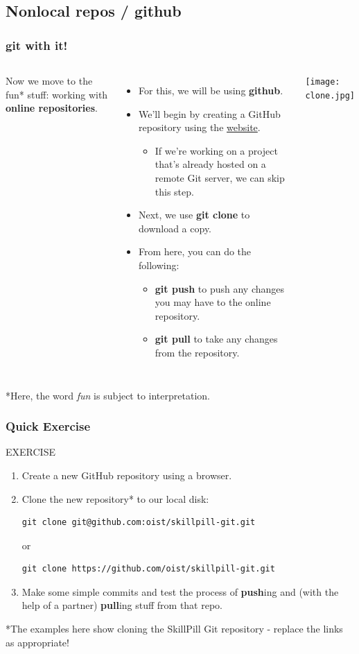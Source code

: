 \documentclass{beamer}
\begin{document}
\subsection{Nonlocal repos / github}

\begin{frame}
\frametitle{\textbf{git} with it!}
\begin{columns}
Now we move to the fun* stuff: working with \textbf{online repositories}.
\begin{itemize}
\item For this, we will be using \textbf{github}.
\item We'll begin by creating a GitHub repository using the \href{www.github.com}{website}.
\begin{itemize}
\item If we're working on a project that's already hosted on a remote Git server, we can skip this step.
\end{itemize}
\item Next, we use \textbf{git clone} to download a copy.
\item From here, you can do the following:
\begin{itemize}
\item \textbf{git push} to push any changes you may have to the online repository.
\item \textbf{git pull} to take any changes from the repository.
\end{itemize}
\end{itemize}
\texttt{[image: clone.jpg]}
\end{columns}

*Here, the word \textit{fun} is subject to interpretation.
\end{frame}

\begin{frame}[fragile]
\frametitle{Quick Exercise}
    \begin{block}{EXERCISE}
        \begin{enumerate}
        \item Create a new GitHub repository using a browser.
        \item Clone the new repository* to our local disk:
        \begin{lstlisting}
git clone git@github.com:oist/skillpill-git.git
        \end{lstlisting}
        or
        \begin{lstlisting}
git clone https://github.com/oist/skillpill-git.git
        \end{lstlisting}
        \item Make some simple commits and test the process of \textbf{push}ing and (with the help of a partner) \textbf{pull}ing stuff from that repo.
        \end{enumerate}
    \end{block}

*The examples here show cloning the SkillPill Git repository - replace the links as appropriate!
\end{frame}
\end{document}
